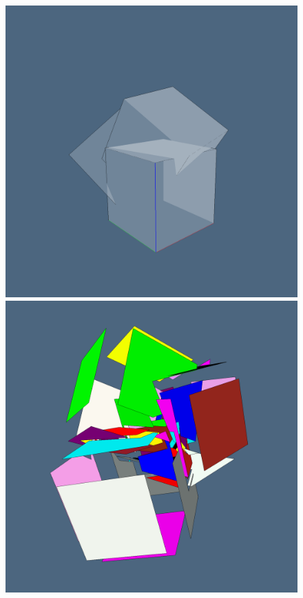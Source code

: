 \documentclass{juliacon}
\begin{document}
\begin{figure}[htbp] %
   \centering
   \includegraphics[width=0.5\linewidth]{figs/3cubes1.png}%
   \includegraphics[width=0.5\linewidth]{figs/3cubes2.png}%
   

\end{figure}
\end{document}
